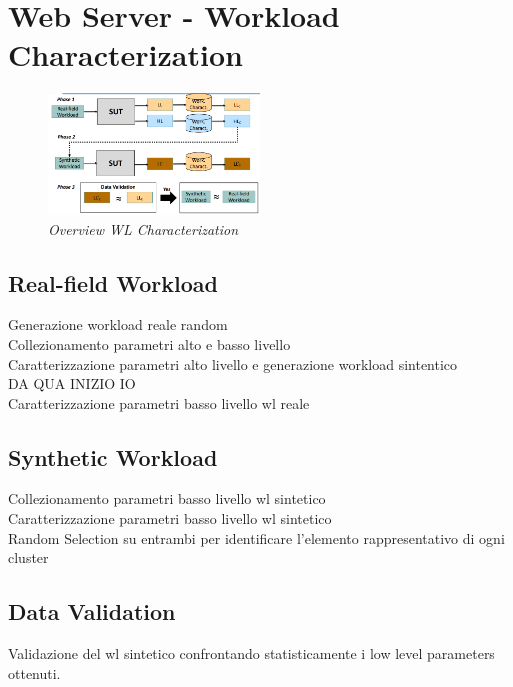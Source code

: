 \chapter{Web Server - Workload Characterization}
\begin{figure}[H]
	\centering
	\includegraphics[width=0.5\textwidth]{img/hw3/Overview.png}
	\caption{\textit{Overview WL Characterization}}
\end{figure}
\section{Real-field Workload}
Generazione workload reale random
\\
Collezionamento parametri alto e basso livello
\\
Caratterizzazione parametri alto livello e generazione workload sintentico
\\
DA QUA INIZIO IO
\\
Caratterizzazione parametri basso livello wl reale
\section{Synthetic Workload}
Collezionamento parametri basso livello wl sintetico
\\
Caratterizzazione parametri basso livello wl sintetico
\\
Random Selection su entrambi per identificare l'elemento rappresentativo di ogni cluster
\section{Data Validation}
Validazione del wl sintetico confrontando statisticamente i low level parameters ottenuti.
